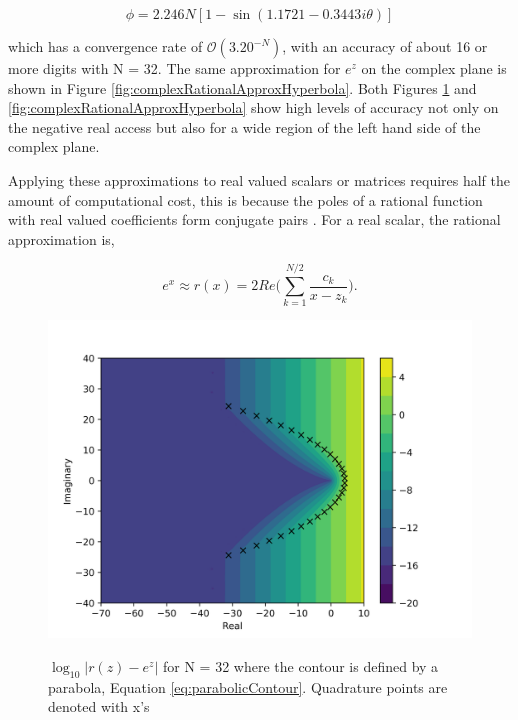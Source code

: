 \begin{equation}
    \phi = 2.246N[1 - \sin(1.1721 - 0.3443i\theta)]
    \label{eq:hyperbolicContour}
\end{equation}

\noindent which has a convergence rate of $\mathcal{O}(3.20^{-N} )$, with an accuracy of about 16 or more digits with N = 32. The same approximation for $e^{z}$ on the complex plane is shown in Figure \ref{fig:complexRationalApproxHyperbola}. Both Figures \ref{fig:complexRationalApproxParabola} and \ref{fig:complexRationalApproxHyperbola} show high levels of accuracy not only on the negative real access but also for a wide region of the left hand side of the complex plane. 

Applying these approximations to real valued scalars or matrices requires half the amount of computational cost, this is because the poles of a rational function with real valued coefficients form conjugate pairs \cite{pusa2011}. For a real scalar, the rational approximation is,

\begin{equation}
    e^{x} \approx r(x) = 2Re\bigg(\sum_{k=1}^{N/2}\frac{c_{k}}{x - z_{k}}\bigg).
\end{equation}

\clearpage

\begin{figure}[p]
  \centering
  \includegraphics[width=5in]{images/chapter-3/RationApproxParabolicError32.png}\\
  \caption{$\log_{10}|r(z)-e^{z}|$ for N = 32 where the contour is defined by a parabola, Equation \ref{eq:parabolicContour}. Quadrature points are denoted with x's}
  \label{fig:complexRationalApproxParabola}
\end{figure} 

